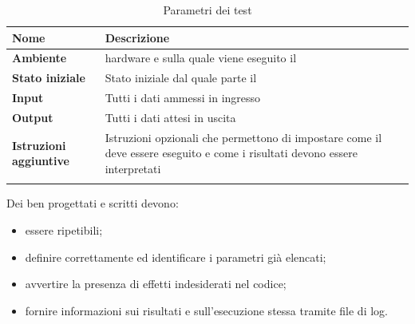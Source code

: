 {{\setlength{\freewidth}{\dimexpr\textwidth-0\tabcolsep}
	\renewcommand{\arraystretch}{1.5}
	\setlength{\aboverulesep}{0pt}
	\setlength{\belowrulesep}{0pt}
	\begin{longtable}{L{.210\freewidth} L{.6\freewidth} L{.080\freewidth}}
		\textbf{Nome} & \textbf{Descrizione} \\
		\toprule
		\endhead		
		\textbf{Ambiente} &  hardware e  sulla quale viene eseguito il  \\
		\textbf{Stato iniziale} & Stato iniziale dal quale parte il  \\
		 \textbf{Input} & Tutti i dati ammessi in ingresso \\
		\textbf{Output} & Tutti i dati attesi in uscita \\
		 \textbf{Istruzioni aggiuntive} & Istruzioni opzionali che permettono di impostare come il  deve essere eseguito e come i risultati devono essere interpretati \\
		\bottomrule
		\hiderowcolors
		\caption{Parametri dei test}
	\end{longtable}


Dei  ben progettati e scritti devono:
\begin{itemize}
	\item essere ripetibili;
	\item definire correttamente ed identificare i parametri già elencati;
	\item avvertire la presenza di effetti indesiderati nel codice;
	\item fornire informazioni sui risultati e sull'esecuzione stessa tramite file di log.
\end{itemize}

}}
